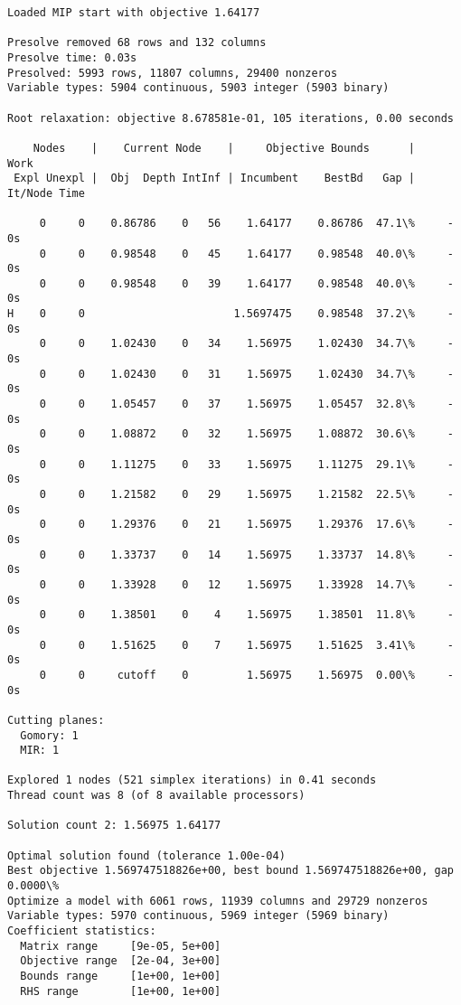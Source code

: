 \documentclass[11pt]{article}
\begin{document}
\begin{Verbatim}[commandchars=\\\{\}]
Loaded MIP start with objective 1.64177

Presolve removed 68 rows and 132 columns
Presolve time: 0.03s
Presolved: 5993 rows, 11807 columns, 29400 nonzeros
Variable types: 5904 continuous, 5903 integer (5903 binary)

Root relaxation: objective 8.678581e-01, 105 iterations, 0.00 seconds

    Nodes    |    Current Node    |     Objective Bounds      |     Work
 Expl Unexpl |  Obj  Depth IntInf | Incumbent    BestBd   Gap | It/Node Time

     0     0    0.86786    0   56    1.64177    0.86786  47.1\%     -    0s
     0     0    0.98548    0   45    1.64177    0.98548  40.0\%     -    0s
     0     0    0.98548    0   39    1.64177    0.98548  40.0\%     -    0s
H    0     0                       1.5697475    0.98548  37.2\%     -    0s
     0     0    1.02430    0   34    1.56975    1.02430  34.7\%     -    0s
     0     0    1.02430    0   31    1.56975    1.02430  34.7\%     -    0s
     0     0    1.05457    0   37    1.56975    1.05457  32.8\%     -    0s
     0     0    1.08872    0   32    1.56975    1.08872  30.6\%     -    0s
     0     0    1.11275    0   33    1.56975    1.11275  29.1\%     -    0s
     0     0    1.21582    0   29    1.56975    1.21582  22.5\%     -    0s
     0     0    1.29376    0   21    1.56975    1.29376  17.6\%     -    0s
     0     0    1.33737    0   14    1.56975    1.33737  14.8\%     -    0s
     0     0    1.33928    0   12    1.56975    1.33928  14.7\%     -    0s
     0     0    1.38501    0    4    1.56975    1.38501  11.8\%     -    0s
     0     0    1.51625    0    7    1.56975    1.51625  3.41\%     -    0s
     0     0     cutoff    0         1.56975    1.56975  0.00\%     -    0s

Cutting planes:
  Gomory: 1
  MIR: 1

Explored 1 nodes (521 simplex iterations) in 0.41 seconds
Thread count was 8 (of 8 available processors)

Solution count 2: 1.56975 1.64177 

Optimal solution found (tolerance 1.00e-04)
Best objective 1.569747518826e+00, best bound 1.569747518826e+00, gap 0.0000\%
Optimize a model with 6061 rows, 11939 columns and 29729 nonzeros
Variable types: 5970 continuous, 5969 integer (5969 binary)
Coefficient statistics:
  Matrix range     [9e-05, 5e+00]
  Objective range  [2e-04, 3e+00]
  Bounds range     [1e+00, 1e+00]
  RHS range        [1e+00, 1e+00]


\end{Verbatim}
\end{document}
